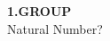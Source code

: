 \documentclass{amsart}
\begin{document}
\noindent
\textbf{1.GROUP}\\

Natural Number?

\noindent
\end{document}
